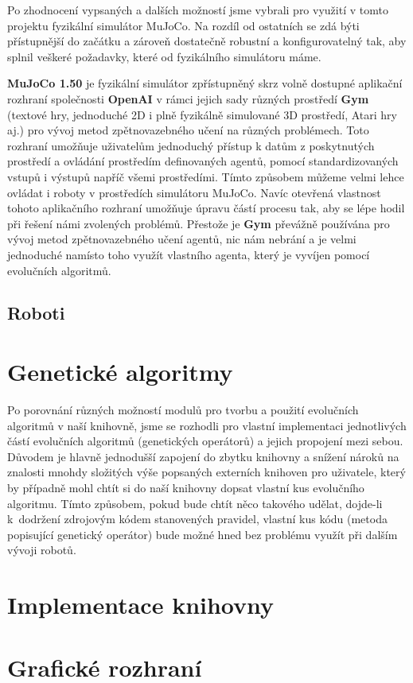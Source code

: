 Po zhodnocení vypsaných a dalších možností jsme vybrali pro využití v tomto
projektu fyzikální simulátor MuJoCo. Na rozdíl od ostatních se zdá býti
přístupnější do začátku a zároveň dostatečně robustní a konfigurovatelný tak,
aby splnil veškeré požadavky, které od fyzikálního simulátoru máme.

\textbf{MuJoCo 1.50} je fyzikální simulátor zpřístupněný skrz volně dostupné
aplikační rozhraní společnosti \textbf{OpenAI} v rámci jejich sady různých
prostředí \textbf{Gym} (textové hry, jednoduché 2D i plně fyzikálně simulované
3D prostředí, Atari hry aj.) pro vývoj metod zpětnovazebného učení na různých
problémech. Toto rozhraní umožňuje uživatelům jednoduchý přístup k datům z
poskytnutých prostředí a ovládání prostředím definovaných agentů, pomocí
standardizovaných vstupů i výstupů napříč všemi prostředími. Tímto způsobem
můžeme velmi lehce ovládat i roboty v prostředích simulátoru MuJoCo. Navíc
otevřená vlastnost tohoto aplikačního rozhraní umožňuje úpravu částí procesu
tak, aby se lépe hodil při řešení námi zvolených problémů. Přestože je
\textbf{Gym} převážně používána pro vývoj metod zpětnovazebného učení agentů,
nic nám nebrání a je velmi jednoduché namísto toho využít vlastního agenta,
který je vyvíjen pomocí evolučních algoritmů.

\subsection{Roboti}

\section{Genetické algoritmy}

Po porovnání různých možností modulů pro tvorbu a použití evolučních algoritmů
v naší knihovně, jsme se rozhodli pro vlastní implementaci jednotlivých částí
evolučních algoritmů (genetických operátorů) a jejich propojení mezi sebou.
Důvodem je hlavně jednodušší zapojení do zbytku knihovny a snížení nároků na
znalosti mnohdy složitých výše popsaných externích knihoven pro uživatele,
který by případně mohl chtít si do naší knihovny dopsat vlastní kus evolučního
algoritmu. Tímto způsobem, pokud bude chtít něco takového udělat, dojde-li
k~dodržení zdrojovým kódem stanovených pravidel, vlastní kus kódu (metoda
popisující genetický operátor) bude možné hned bez problému využít při dalším
vývoji robotů.

\section{Implementace knihovny}

\section{Grafické rozhraní}
